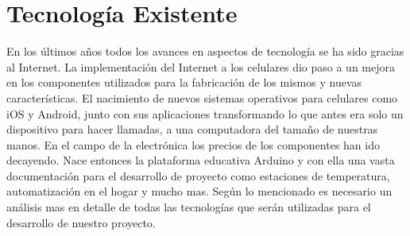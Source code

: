 \section{Tecnología Existente}

\par \noindent
En los últimos años todos los avances en aspectos de tecnología se ha sido gracias al Internet. La implementación del Internet a los celulares dio paso a un mejora en los componentes utilizados para la fabricación de los mismos y nuevas características. El nacimiento de nuevos sistemas operativos para celulares como iOS y Android, junto con sus aplicaciones transformando lo que antes era solo un dispositivo para hacer llamadas, a una computadora del tamaño de nuestras manos. En el campo de la electrónica los precios de los componentes han ido decayendo. Nace entonces la plataforma educativa Arduino y con ella una vasta documentación para el desarrollo de proyecto como estaciones de temperatura, automatización en el hogar y mucho mas. Según lo mencionado es necesario un análisis mas en detalle de todas las tecnologías que serán utilizadas para el desarrollo de nuestro proyecto.












